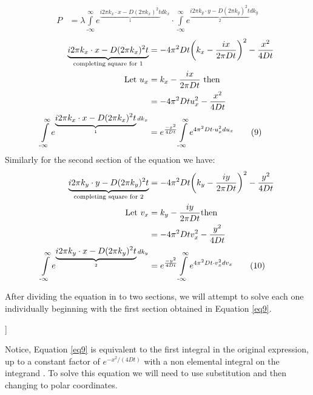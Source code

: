 \begin{@twocolumnfalse}
  \begin{align}
    P &= \lambda \int\limits^{\infty}_{\text{-}\infty} e^{\underbrace{i 2\pi k_x \cdot x-D (2 \pi k_x)^2 t}_{\text{1}}dk_x} \cdot \int\limits^{\infty}_{\text{-}\infty} e^{\underbrace{i 2\pi k_y \cdot y-D (2 \pi k_y)^2 t}_{\text{2}}dk_y}
\end{align} 
\begin{align}
    \underbrace{i 2\pi k_x \cdot x-D (2 \pi k_x)^2 t}_{\text{completing square for 1}} &= -4 \pi^2 D t \bigg(k_x -\frac{ix}{2 \pi D t}\bigg)^2 - \frac{x^2}{4 D t} \\
    \textnormal{ Let } u_x &= k_x -\frac{ix}{2 \pi D t} \textnormal{ then }\\
      &= -4 \pi^2 D t u_x^2 - \frac{x^2}{4 D t}\\  
    \int\limits^{\infty}_{\text{-}\infty} e^{\underbrace{i 2\pi k_x \cdot x-D (2 \pi k_x)^2 t}_{\text{1}}dk_x} &= e^{\frac{-x^2}{4 D t}}\int\limits^{\infty}_{\text{-}\infty} e^{4 \pi^2 D t \cdot u_x^2 du_x} \tag{9}
    \label{eq9}\\
\end{align}  
Similarly for the second section of the equation we have:
  \begin{align}  
    \underbrace{i 2\pi k_y \cdot y-D (2 \pi k_y)^2 t}_{\text{completing square for 2}} &= -4 \pi^2 D t \bigg(k_y -\frac{iy}{2 \pi D t}\bigg)^2 - \frac{y^2}{4 D t} \\
    \textnormal{ Let } v_x &= k_y -\frac{iy}{2 \pi D t} \textnormal{then} \\
      &= -4 \pi^2 D t v_x^2 - \frac{y^2}{4 D t} \\  
    \int\limits^{\infty}_{\text{-}\infty} e^{\underbrace{i 2\pi k_y \cdot x-D (2 \pi k_y)^2 t}_{\text{2}}dk_y} &= e^{\frac{-y^2}{4 D t}}\int\limits^{\infty}_{\text{-}\infty} e^{4 \pi^2 D t \cdot v_x^2 dv_x} \tag{10}
    \label{eq10}
\end{align} 

After dividing the equation in to two sections, we will attempt to solve each one individually beginning with the first section obtained in Equation \eqref{eq9}. \\
\end{@twocolumnfalse}]

Notice, Equation \eqref{eq9} is equivalent to the first integral in the original expression, up to a constant factor of $e^{-x^2/(4 D t)}$ with a non elemental integral on the integrand \cite{conradB}. To solve this equation we will need to use substitution and then changing to polar coordinates.

